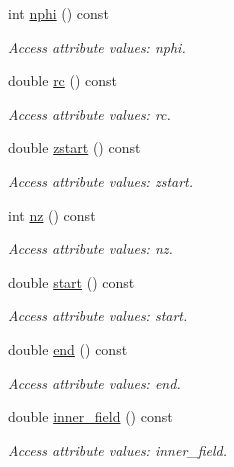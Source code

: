 \begin{DoxyCompactItemize}
int \hyperlink{struct_d_d4hep_1_1_x_m_l_1_1_child_value_a1b34e68566d9b01889189d2ce22ff2dc}{nphi} () const 
\begin{DoxyCompactList}\small\item\em Access attribute values: nphi. \item\end{DoxyCompactList}\item 
double \hyperlink{struct_d_d4hep_1_1_x_m_l_1_1_child_value_a1d2342902e203600ef7293ead40ff2f7}{rc} () const 
\begin{DoxyCompactList}\small\item\em Access attribute values: rc. \item\end{DoxyCompactList}\item 
double \hyperlink{struct_d_d4hep_1_1_x_m_l_1_1_child_value_ab33e2fea13f50317a46c4df3da8ed421}{zstart} () const 
\begin{DoxyCompactList}\small\item\em Access attribute values: zstart. \item\end{DoxyCompactList}\item 
int \hyperlink{struct_d_d4hep_1_1_x_m_l_1_1_child_value_af8cab783abcdf81dea15baa335d261c2}{nz} () const 
\begin{DoxyCompactList}\small\item\em Access attribute values: nz. \item\end{DoxyCompactList}\item 
double \hyperlink{struct_d_d4hep_1_1_x_m_l_1_1_child_value_ae3db07fc7382bee6cca13d3af5f709cb}{start} () const 
\begin{DoxyCompactList}\small\item\em Access attribute values: start. \item\end{DoxyCompactList}\item 
double \hyperlink{struct_d_d4hep_1_1_x_m_l_1_1_child_value_acbe060155600bd3e0d9b85995e5fe860}{end} () const 
\begin{DoxyCompactList}\small\item\em Access attribute values: end. \item\end{DoxyCompactList}\item 
double \hyperlink{struct_d_d4hep_1_1_x_m_l_1_1_child_value_a336f68ec8fa31f99878750ac462517b4}{inner\_\-field} () const 
\begin{DoxyCompactList}\small\item\em Access attribute values: inner\_\-field. \item\end{DoxyCompactList}\item 

\end{DoxyCompactItemize}
